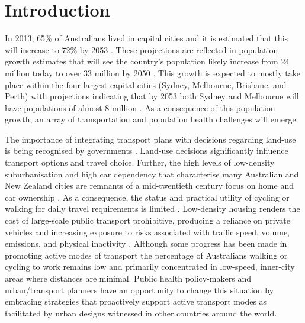 \documentclass[sageh,times]{sagej}
\begin{document}

\maketitle


\section{Introduction}\label{sec:introduction}



 
In 2013, 65\% of Australians lived in capital cities and it is estimated that this will increase to 72\% by 2053  \citep{ABS2008}. These projections are reflected in population growth estimates that will see the country's population likely increase from 24 million today to over 33 million by 2050  \citep{ABS2008}. This growth is expected to mostly take place within the four largest capital cities (Sydney, Melbourne, Brisbane, and Perth) with projections indicating that by 2053 both Sydney and Melbourne will have populations of almost 8 million  \citep{CommonwealthofAustralia2010}. As a consequence of this population growth, an array of transportation and population health challenges will emerge.

The importance of integrating transport plans with decisions regarding land-use is being recognised by governments \citep{ATAP2016,SAustralia2015}. Land-use decisions significantly influence transport options and travel choice. Further, the high levels of low-density suburbanisation and high car dependency that characterise many Australian and New Zealand cities are remnants of a mid-twentieth century focus on home and car ownership \citep{Currie2007,Dodson2008}. As a consequence, the status and practical utility of cycling or walking for daily travel requirements is limited \citep{Heesch2014,Daley2011}. Low-density housing renders the cost of large-scale public transport prohibitive, producing a reliance on private vehicles and increasing exposure to risks associated with traffic speed, volume, emissions, and physical inactivity  \citep{Cepeda2016,MingWen2008,Norman2006}. Although some progress has been made in promoting active modes of transport the percentage of Australians walking or cycling to work remains low and primarily concentrated in low-speed, inner-city areas where distances are minimal. Public health policy-makers and urban/transport planners have an opportunity to change this situation by embracing strategies that proactively support active transport modes as facilitated by urban designs witnessed in other countries around the world.
\end{document}
